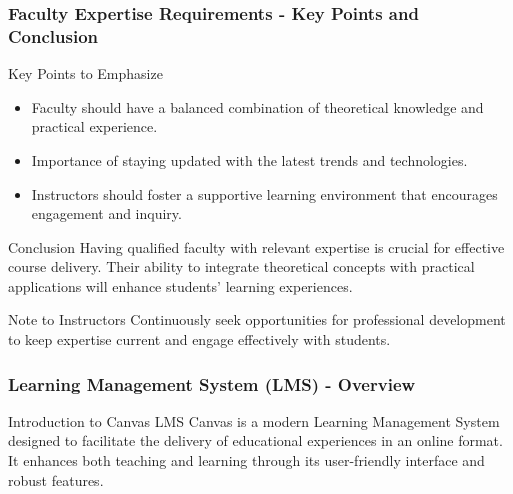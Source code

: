 \documentclass[aspectratio=169]{beamer}
\begin{document}
\begin{frame}[fragile]
    \frametitle{Faculty Expertise Requirements - Key Points and Conclusion}
    \begin{block}{Key Points to Emphasize}
        \begin{itemize}
            \item Faculty should have a balanced combination of theoretical knowledge and practical experience.
            \item Importance of staying updated with the latest trends and technologies.
            \item Instructors should foster a supportive learning environment that encourages engagement and inquiry.
        \end{itemize}
    \end{block}

    \begin{block}{Conclusion}
        Having qualified faculty with relevant expertise is crucial for effective course delivery. Their ability to integrate theoretical concepts with practical applications will enhance students' learning experiences.
    \end{block}

    \begin{block}{Note to Instructors}
        Continuously seek opportunities for professional development to keep expertise current and engage effectively with students.
    \end{block}
\end{frame}

\begin{frame}[fragile]
    \frametitle{Learning Management System (LMS) - Overview}
    \begin{block}{Introduction to Canvas LMS}
        Canvas is a modern Learning Management System designed to facilitate the delivery of educational experiences in an online format. It enhances both teaching and learning through its user-friendly interface and robust features.
    \end{block}
\end{frame}
\end{document}
